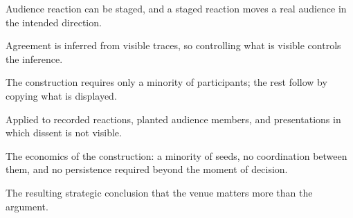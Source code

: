 

\begin{distilled}
  \item Audience reaction can be staged, and a staged reaction moves a real audience in the intended direction.
  \item Agreement is inferred from visible traces, so controlling what is visible controls the inference.
  \item The construction requires only a minority of participants; the rest follow by copying what is displayed.
  \item Applied to recorded reactions, planted audience members, and presentations in which dissent is not visible.
\end{distilled}

\begin{unique}
  \item The economics of the construction: a minority of seeds, no coordination between them, and no persistence required beyond the moment of decision.
  \item The resulting strategic conclusion that the venue matters more than the argument.
\end{unique}

